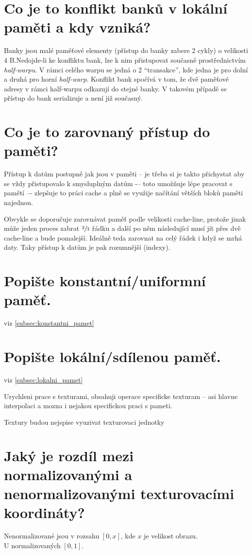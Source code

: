 \section{Co je to konflikt banků v lokální paměti a kdy vzniká?}
	Banky jsou malé paměťové elementy (přístup do banky zabere 2 cykly) o velikosti 4 B.Nedojde-li ke konfliktu bank, lze k nim přistupovat současně prostřednictvím \emph{half-warpu}. V rámci celého warpu se jedná o 2 “transakce”, kde jedna je pro dolní a druhá pro horní \emph{half-warp}. Konflikt bank spočívá v tom, že dvě paměťové adresy v rámci half-warpu odkazují do stejné banky. V takovém případě se přístup do bank serializuje a není již současný.


\section{Co je to zarovnaný přístup do paměti?}
	Přístup k datům postupně jak jsou v paměti – je třeba si je takto přichystat aby se vždy přistupovalo k smysluplným datům -– toto umožňuje lépe pracovat s pamětí –- zlepšuje to práci cache a plně se využije načítání větších bloků paměti najednou.
	
	Obvykle se doporučuje zarovnávat paměť podle velikosti cache-line, protože jinak může jeden proces zabrat $\sfrac{2}{3}$ řádku a další po něm následující musí jít přes dvě cache-line a bude pomalejší. Ideálně teda zarovnat na celý řádek i když se mrhá daty. Taky přístup k datům je pak rozumnější (indexy).
	


\section{Popište konstantní/uniformní paměť.}
	viz \ref{subsec:konstantni_pamet}


\section{Popište lokální/sdílenou paměť.}
	viz \ref{subsec:lokalni_pamet}


	Urychleni prace s texturami, obsahuji operace specificke texturam – asi hlavne interpolaci a mozna i nejakou specifickou praci s pameti.


	Textury budou nejspise vyuzivat texturovaci jednotky
	

\section{Jaký je rozdíl mezi normalizovanými a nenormalizovanými texturovacími koordináty?}
	Nenormalizované jsou v rozsahu $[0, x]$, kde $x$ je velikost obrazu.  \\
	U normalizovaných $[0, 1]$.


